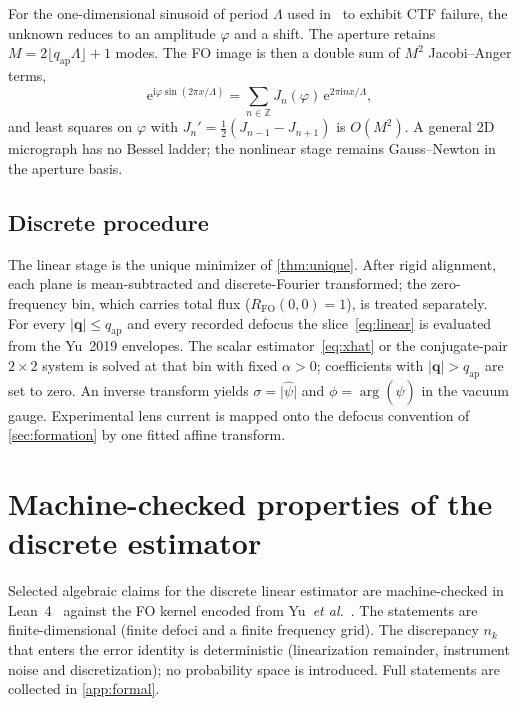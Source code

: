 \documentclass[11pt,a4paper]{article}
\theoremstyle{definition}
\theoremstyle{remark}
\newcommand{\Z}{\mathbb{Z}}
\newcommand{\ee}{\mathrm{e}}
\newcommand{\ii}{\mathrm{i}}
\newcommand{\abs}[1]{\lvert#1\rvert}
\newcommand{\qap}{q_{\mathrm{ap}}}
\newcommand{\RFO}{R_{\mathrm{FO}}}
\begin{document}
For the one-dimensional sinusoid of period $\Lambda$ used
in~\cite{Yu2017,Yu2019} to exhibit CTF failure, the unknown reduces to
an amplitude $\varphi$ and a shift.
The aperture retains
$M=2\lfloor\qap\Lambda\rfloor+1$ modes.
The FO image is then a double sum of $M^2$ Jacobi--Anger terms,
\begin{equation}
\label{eq:JA}
\ee^{\ii\varphi\sin(2\pi x/\Lambda)}
=\sum_{n\in\Z}J_n(\varphi)\,\ee^{2\pi\ii n x/\Lambda},
\end{equation}
and least squares on $\varphi$ with
$J_n'=\tfrac12(J_{n-1}-J_{n+1})$ is $O(M^2)$.
A general 2D micrograph has no Bessel ladder; the nonlinear stage
remains Gauss--Newton in the aperture basis.

\subsection{Discrete procedure}
\label{sec:algo}

The linear stage is the unique minimizer of \cref{thm:unique}.
After rigid alignment, each plane is mean-subtracted and
discrete-Fourier transformed; the zero-frequency bin, which carries
total flux ($\RFO(0,0)=1$), is treated separately.
For every $\abs{\mathbf{q}}\le\qap$ and every recorded defocus the
slice~\eqref{eq:linear} is evaluated from the Yu~2019 envelopes.
The scalar estimator~\eqref{eq:xhat} or the conjugate-pair
$2\times 2$ system is solved at that bin with fixed $\alpha>0$;
coefficients with $\abs{\mathbf{q}}>\qap$ are set to zero.
An inverse transform yields $\sigma=\abs{\hat\psi}$ and
$\phi=\arg(\hat\psi)$ in the vacuum gauge.
Experimental lens current is mapped onto the defocus convention of
\cref{sec:formation} by one fitted affine transform.

\section{Machine-checked properties of the discrete estimator}
\label{sec:lean}

Selected algebraic claims for the discrete linear estimator are
machine-checked in Lean~4~\cite{deMoura2021,mathlib2020} against the
FO kernel encoded from Yu~\emph{et al.}~\cite{Yu2019,Lau2026proofs}.
The statements are finite-dimensional (finite defoci and a finite
frequency grid).
The discrepancy $n_k$ that enters the error identity is deterministic
(linearization remainder, instrument noise and discretization); no
probability space is introduced.
Full statements are collected in \cref{app:formal}.
\end{document}
